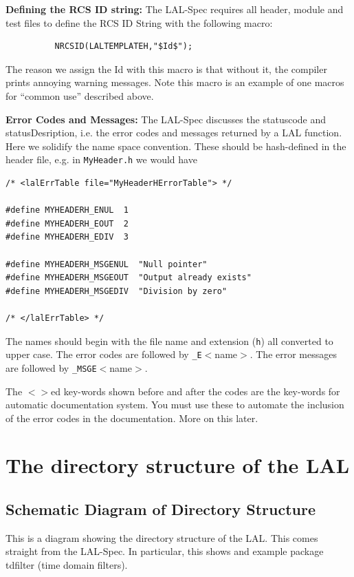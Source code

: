 \documentclass[oneside]{book}
\begin{document}
\bigskip

{\noindent \bf Defining the RCS ID string:}  The LAL-Spec
requires all header, module and test files to define the
RCS ID String with the following macro:
\begin{verbatim}
          NRCSID(LALTEMPLATEH,"$Id$");
\end{verbatim}
\noindent The reason we assign the Id with this macro is that without it,
the compiler prints annoying warning messages. Note this macro is an
example of one macros for ``common use'' described above.

\bigskip

{\noindent \bf Error Codes and Messages:} The LAL-Spec discusses the
statuscode and statusDesription, i.e. the error codes and  messages
returned by a LAL function. Here we solidify the name space
convention. These should be hash-defined in the header file, e.g. in
{\tt MyHeader.h} we would have
\begin{verbatim}
/* <lalErrTable file="MyHeaderHErrorTable"> */

#define MYHEADERH_ENUL  1
#define MYHEADERH_EOUT  2
#define MYHEADERH_EDIV  3

#define MYHEADERH_MSGENUL  "Null pointer"
#define MYHEADERH_MSGEOUT  "Output already exists"
#define MYHEADERH_MSGEDIV  "Division by zero"

/* </lalErrTable> */
\end{verbatim}
\noindent The names should begin with the file name and extension ({\tt h})
all converted to upper case. The error codes are followed by
{\tt \_E}$<$name$>$. The error messages are followed by
{\tt \_MSGE}$<$name$>$.

The $<>$ed key-words shown before and after the codes are the
key-words for automatic documentation system.  You must use these to
automate the inclusion of the error codes in the documentation.  More
on this later.

\chapter{The directory structure of the LAL}
\label{c:DirectoryStructure}

\newpage
\section{Schematic Diagram of Directory Structure}
This is a diagram showing the   directory structure of the LAL.
This comes straight from the LAL-Spec. In particular, this shows
and example package tdfilter  (time domain filters).
\end{document}
